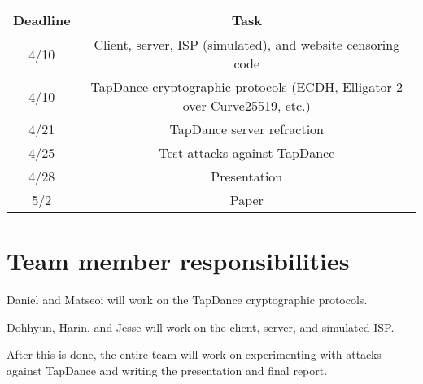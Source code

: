 \documentclass{article}
\begin{document}
\begin{center}
\begin{tabular}{|c|c|}
    \hline
    Deadline & Task\\
    \hline
    4/10 & Client, server, ISP (simulated), and website censoring code \\
    \hline
    4/10 & TapDance cryptographic protocols (ECDH, Elligator 2 over Curve25519, etc.) \\
    \hline
    4/21 & TapDance server refraction\\
    \hline
    4/25 & Test attacks against TapDance\\
    \hline
    4/28 & Presentation\\
    \hline
    5/2 & Paper\\
    \hline
\end{tabular}
\end{center}

\section{Team member responsibilities}

Daniel and Matseoi will work on the TapDance cryptographic protocols.

Dohhyun, Harin, and Jesse will work on the client, server, and simulated ISP.

After this is done, the entire team will work on experimenting with attacks against TapDance and writing the presentation and final report.

\newpage
\printbibliography
\end{document}
